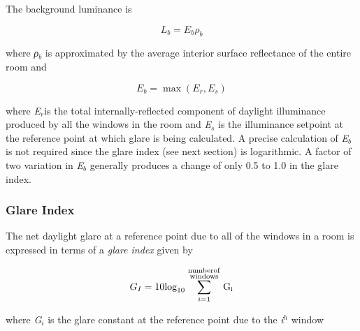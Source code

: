 The background luminance is

\begin{equation}
{L_b} = {E_b}{\rho_b}
\end{equation}

where \emph{ρ\(_{b}\)} is approximated by the average interior surface reflectance of the entire room and

\begin{equation}
{E_b} = \max ({E_r},{E_s})
\end{equation}

where \emph{E\(_{r}\)}is the total internally-reflected component of daylight illuminance produced by all the windows in the room and \emph{E\(_{s}\)} is the illuminance setpoint at the reference point at which glare is being calculated. A precise calculation of \emph{E\(_{b}\)} is not required since the glare index (see next section) is logarithmic. A factor of two variation in \emph{E\(_{b}\)} generally produces a change of only 0.5 to 1.0 in the glare index.

\subsubsection{Glare Index}\label{glare-index}

The net daylight glare at a reference point due to all of the windows in a room is expressed in terms of a \emph{glare index} given by

\begin{equation}
{G_I} = 10{\log_{10}}\sum\limits_{i = 1}^{\scriptstyle{\rm{number of}}\atop\scriptstyle{\rm{windows}}} {{{\rm{G}}_{\rm{i}}}}
\end{equation}

where \emph{G\(_{i}\)} is the glare constant at the reference point due to the \emph{i\(^{h}\)} window
